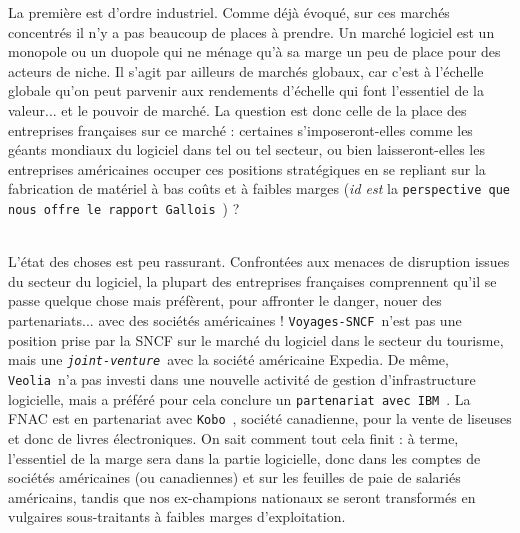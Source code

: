 \documentclass[11pt,twoside,a4paper]{article}
\begin{document}
La premi{\`e}re est d'ordre industriel. Comme d{\'e}j{\`a} {\'e}voqu{\'e}, sur ces march{\'e}s concentr{\'e}s il n'y a pas beaucoup de places {\`a} prendre. Un march{\'e} logiciel est un monopole ou un duopole qui ne m{\'e}nage qu'{\`a} sa marge un peu de place pour des acteurs de niche. Il s'agit par ailleurs de march{\'e}s globaux, car c'est {\`a} l'{\'e}chelle globale qu'on peut parvenir aux rendements d'{\'e}chelle qui font l'essentiel de la valeur... et le pouvoir de march{\'e}. La question est donc celle de la place des entreprises fran\c{c}aises sur ce march{\'e} : certaines s'imposeront-elles comme les g{\'e}ants mondiaux du logiciel dans tel ou tel secteur, ou bien laisseront-elles les entreprises am{\'e}ricaines occuper ces positions strat{\'e}giques en se repliant sur la fabrication de mat{\'e}riel {\`a} bas co{\^u}ts et {\`a} faibles marges (\emph{id est} la \texttt{perspective que nous offre le rapport Gallois}~\footnotemark) ? ~\\
~

L'{\'e}tat des choses est peu rassurant. Confront{\'e}es aux menaces de disruption issues du secteur du logiciel, la plupart des entreprises fran\c{c}aises comprennent qu'il se passe quelque chose mais pr{\'e}f{\`e}rent, pour affronter le danger, nouer des partenariats... avec des soci{\'e}t{\'e}s am{\'e}ricaines ! \texttt{Voyages-SNCF}~\footnotemark n'est pas une position prise par la SNCF sur le march{\'e} du logiciel dans le secteur du tourisme, mais une \texttt{\emph{joint-venture}}~\footnotemark avec la soci{\'e}t{\'e} am{\'e}ricaine Expedia. De m{\^e}me, \texttt{Veolia}~\footnotemark n'a pas investi dans une nouvelle activit{\'e} de gestion d'infrastructure logicielle, mais a pr{\'e}f{\'e}r{\'e} pour cela conclure un \texttt{partenariat avec IBM}~\footnotemark. La FNAC est en partenariat avec \texttt{Kobo}~\footnotemark, soci{\'e}t{\'e} canadienne, pour la vente de liseuses et donc de livres {\'e}lectroniques. On sait comment tout cela finit : {\`a} terme, l'essentiel de la marge sera dans la partie logicielle, donc dans les comptes de soci{\'e}t{\'e}s am{\'e}ricaines (ou canadiennes) et sur les feuilles de paie de salari{\'e}s am{\'e}ricains, tandis que nos ex-champions nationaux se seront transform{\'e}s en vulgaires sous-traitants {\`a} faibles marges d'exploitation. ~\\
\end{document}
